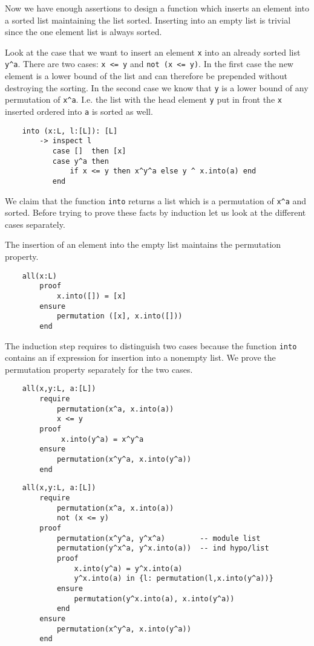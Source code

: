 Now we have enough assertions to design a function which inserts an element
into a sorted list maintaining the list sorted. Inserting into an empty list
is trivial since the one element list is always sorted.

Look at the case that we want to insert an element \lstinline!x! into an
already sorted list \lstinline!y^a!. There are two cases: \lstinline!x <= y!
and \lstinline!not (x <= y)!. In the first case the new element is a lower
bound of the list and can therefore be prepended without destroying the
sorting. In the second case we know that \lstinline!y! is a lower bound of any
permutation of \lstinline!x^a!. I.e. the list with the head element
\lstinline!y! put in front the \lstinline!x! inserted ordered into
\lstinline!a! is sorted as well.

\begin{lstlisting}
    into (x:L, l:[L]): [L]
        -> inspect l
           case []  then [x]
           case y^a then
               if x <= y then x^y^a else y ^ x.into(a) end
           end
\end{lstlisting}

We claim that the function \lstinline!into! returns a list which is a
permutation of \lstinline!x^a! and sorted. Before trying to prove these facts
by induction let us look at the different cases separately.

The insertion of an element into the empty list maintains the permutation
property.

\begin{lstlisting}
    all(x:L)
        proof
            x.into([]) = [x]
        ensure
            permutation ([x], x.into([]))
        end
\end{lstlisting}

The induction step requires to distinguish two cases because the function
\lstinline!into! contains an if expression for insertion into a nonempty
list. We prove the permutation property separately for the two cases.

\begin{lstlisting}
    all(x,y:L, a:[L])
        require
            permutation(x^a, x.into(a))
            x <= y
        proof
             x.into(y^a) = x^y^a
        ensure
            permutation(x^y^a, x.into(y^a))
        end
\end{lstlisting}

\begin{lstlisting}
    all(x,y:L, a:[L])
        require
            permutation(x^a, x.into(a))
            not (x <= y)
        proof
            permutation(x^y^a, y^x^a)        -- module list
            permutation(y^x^a, y^x.into(a))  -- ind hypo/list
            proof
                x.into(y^a) = y^x.into(a)
                y^x.into(a) in {l: permutation(l,x.into(y^a))}
            ensure
                permutation(y^x.into(a), x.into(y^a))
            end
        ensure
            permutation(x^y^a, x.into(y^a))
        end
\end{lstlisting}

